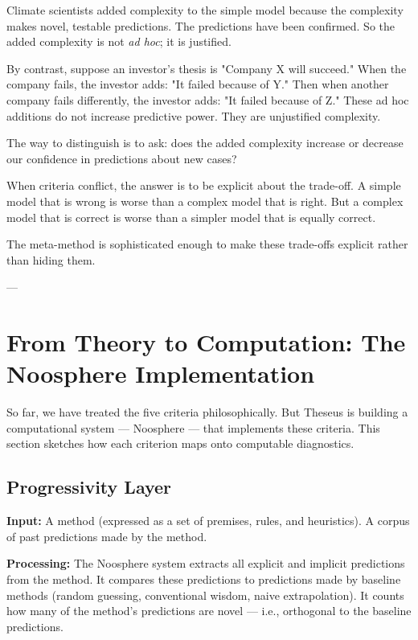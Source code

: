 \documentclass[11pt,letterpaper]{article}
\begin{document}
Climate scientists added complexity to the simple model because the complexity makes novel, testable predictions. The predictions have been confirmed. So the added complexity is not \emph{ad hoc}; it is justified.

By contrast, suppose an investor's thesis is "Company X will succeed." When the company fails, the investor adds: "It failed because of Y." Then when another company fails differently, the investor adds: "It failed because of Z." These ad hoc additions do not increase predictive power. They are unjustified complexity.

The way to distinguish is to ask: does the added complexity increase or decrease our confidence in predictions about new cases?

When criteria conflict, the answer is to be explicit about the trade-off. A simple model that is wrong is worse than a complex model that is right. But a complex model that is correct is worse than a simpler model that is equally correct.

The meta-method is sophisticated enough to make these trade-offs explicit rather than hiding them.

---

\newpage


\section{From Theory to Computation: The Noosphere Implementation}

So far, we have treated the five criteria philosophically. But Theseus is building a computational system — Noosphere — that implements these criteria. This section sketches how each criterion maps onto computable diagnostics.

\subsection*{Progressivity Layer}

\textbf{Input:} A method (expressed as a set of premises, rules, and heuristics). A corpus of past predictions made by the method.

\textbf{Processing:} The Noosphere system extracts all explicit and implicit predictions from the method. It compares these predictions to predictions made by baseline methods (random guessing, conventional wisdom, naive extrapolation). It counts how many of the method's predictions are novel — i.e., orthogonal to the baseline predictions.
\end{document}
